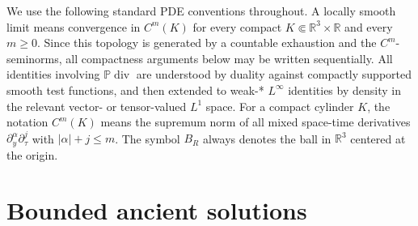 \documentclass[11pt]{amsart}
\theoremstyle{plain}
\theoremstyle{definition}
\theoremstyle{remark}
\numberwithin{equation}{section}
\begin{document}
We use the following standard PDE conventions throughout.  A locally smooth
limit means convergence in \(C^m(K)\) for every compact
\(K\Subset\mathbb R^3\times\mathbb R\) and every \(m\ge0\).  Since this
topology is generated by a countable exhaustion and the \(C^m\)-seminorms, all
compactness arguments below may be written sequentially.  All identities
involving \(\mathbb P\operatorname{div}\) are understood by duality against
compactly supported smooth test functions, and then extended to weak-*
\(L^\infty\) identities by density in the relevant vector- or tensor-valued
\(L^1\) space.
For a compact cylinder \(K\), the notation \(C^m(K)\) means the supremum norm
of all mixed space-time derivatives \(\partial_y^\alpha\partial_\tau^j\) with
\(|\alpha|+j\le m\).  The symbol \(B_R\) always denotes the ball in
\(\mathbb R^3\) centered at the origin.

\section{Bounded ancient solutions}
\end{document}
